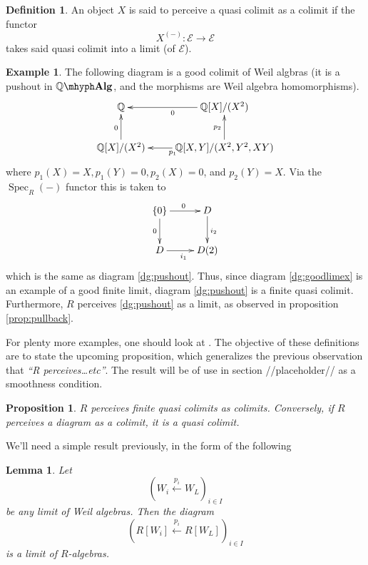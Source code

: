 \documentclass[11pt]{article}
\newtheorem{proposition}{Proposition}[section]
\newtheorem{lemma}{Lemma}[section]
\theoremstyle{definition}
\newtheorem{defn}{Definition}[section]
\newtheorem{exmp}{Example}[defn]
\newcommand{\farg}{-} %
\newcommand{\sdgE}{\mathcal{E}}
\newcommand{\Q}{\mathbb{Q}}
\newcommand{\qalg}{\Q\mhyph\mathbf{Alg}}
\DeclareMathOperator{\spec}{Spec}
\numberwithin{equation}{section}
\begin{document}
\begin{defn}
  An object \( X \) is said to perceive a quasi colimit as a colimit if the functor
  \begin{equation*}
    X^{(\farg)}:\sdgE\to\sdgE
  \end{equation*}
  takes said quasi colimit into a limit (of \( \sdgE \)).
\end{defn}

\begin{exmp}
  The following diagram is a good colimit of Weil algbras (it is a pushout in \( \qalg \), and the morphisms are Weil algebra homomorphisms).
  \begin{equation}
    \xymatrix{
      {\Q}                   & {\Q[X]/(X^2)} \ar[l]^0 \\
      {\Q[X]/(X^2)} \ar[u]^0 & {\Q[X,Y]/(X^2,Y^2,XY)} \ar[u]^{p_2} \ar[l]^{p_1}
    }
    \label{dg:goodlimex}
  \end{equation}
  where \( p_1(X)=X, p_1(Y)=0, p_2(X)=0 \), and \( p_2(Y)=X \). Via the \( \spec_R(\farg) \) functor this is taken to
  \begin{equation*}
    \xymatrix{
      {\{0\}} \ar[d]_0 \ar[r]^0 & D \ar[d]^{i_2} \\
      D \ar[r]_{i_1}            & D(2)
    } 
  \end{equation*}
  which is the same as diagram \ref{dg:pushout}. Thus, since diagram \ref{dg:goodlimex} is an example of a good finite limit, diagram \ref{dg:pushout} is a finite quasi colimit. Furthermore, \( R \) perceives \ref{dg:pushout} as a limit, as observed in proposition \ref{prop:pullback}.
\end{exmp}

For plenty more examples, one should look at \cite{lav96}. The objective of these definitions are to state the upcoming proposition, which generalizes the previous observation that \emph{``R perceives\dots etc''}. The result will be of use in section {//placeholder//} as a smoothness condition.

\begin{proposition}
  \( R \) perceives finite quasi colimits as colimits. Conversely, if \( R \) perceives a diagram as a colimit, it is a quasi colimit. 
  \label{prop:Rperc}
\end{proposition}

We'll need a simple result previously, in the form of the following

\begin{lemma}
  Let 
  \begin{equation*}
   \left(W_i\stackrel{p_i}{\longleftarrow}W_L\right)_{i\in I}
  \end{equation*}
  be any limit of Weil algebras. Then the diagram
  \begin{equation*}
    \left(R[W_i]\stackrel{p_i}{\longleftarrow}R[W_L]\right)_{i\in I}
  \end{equation*}
  is a limit of \( R \)-algebras.  
  \label{lm:Rbracket}
\end{lemma}
\end{document}
